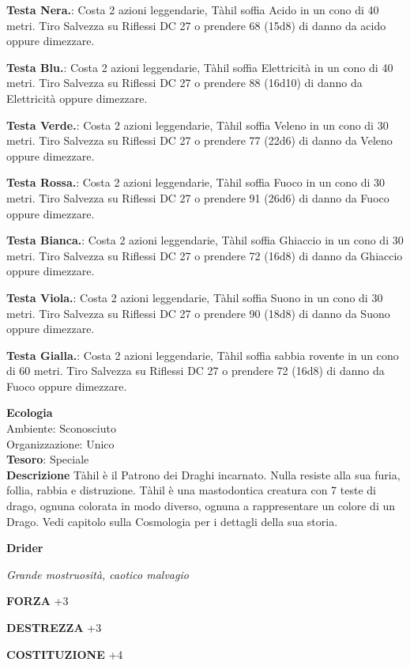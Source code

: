 \begin{multicols}{2}
\textbf{Testa Nera.}: Costa 2 azioni leggendarie, Tàhil soffia Acido in un cono di 40 metri. Tiro Salvezza su Riflessi DC 27 o prendere 68 (15d8) di danno da acido oppure dimezzare.

\textbf{Testa Blu.}: Costa 2 azioni leggendarie, Tàhil soffia Elettricità in un cono di 40 metri. Tiro Salvezza su Riflessi DC 27 o prendere 88 (16d10) di danno da Elettricità oppure dimezzare.

\textbf{Testa Verde.}: Costa 2 azioni leggendarie, Tàhil soffia Veleno in un cono di 30 metri. Tiro Salvezza su Riflessi DC 27 o prendere 77 (22d6) di danno da Veleno oppure dimezzare.

\textbf{Testa Rossa.}: Costa 2 azioni leggendarie, Tàhil soffia Fuoco in un cono di 30 metri. Tiro Salvezza su Riflessi DC 27 o prendere 91 (26d6) di danno da Fuoco oppure dimezzare.

\textbf{Testa Bianca.}: Costa 2 azioni leggendarie, Tàhil soffia Ghiaccio in un cono di 30 metri. Tiro Salvezza su Riflessi DC 27 o prendere 72 (16d8) di danno da Ghiaccio oppure dimezzare.

\textbf{Testa Viola.}: Costa 2 azioni leggendarie, Tàhil soffia Suono in un cono di 30 metri. Tiro Salvezza su Riflessi DC 27 o prendere 90 (18d8) di danno da Suono oppure dimezzare.

\textbf{Testa Gialla.}: Costa 2 azioni leggendarie, Tàhil soffia sabbia rovente in un cono di 60 metri. Tiro Salvezza su Riflessi DC 27 o prendere 72 (16d8) di danno da Fuoco oppure dimezzare.


\textbf{Ecologia}\\
Ambiente: Sconosciuto\\
Organizzazione: Unico\\
\textbf{Tesoro}: Speciale\\

\textbf{Descrizione}
Tàhil è il Patrono dei Draghi incarnato. Nulla resiste alla sua furia, follia, rabbia e distruzione. Tàhil è una mastodontica creatura con 7 teste di drago, ognuna colorata in modo diverso, ognuna a rappresentare un colore di un Drago. Vedi capitolo sulla Cosmologia per i dettagli della sua storia.


\medskip{}\textbf{Drider}

\textit{Grande mostruosità, caotico malvagio}

\textbf{FORZA} +3

\textbf{DESTREZZA} +3

\textbf{COSTITUZIONE} +4


\end{multicols}
